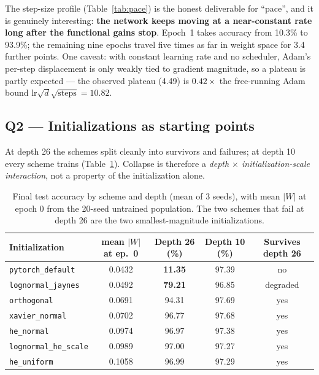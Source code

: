 \documentclass[11pt]{article}
\begin{document}
The step-size profile (Table~\ref{tab:pace}) is the honest deliverable for ``pace'', and it is
genuinely interesting: \textbf{the network keeps moving at a near-constant rate long after the
functional gains stop}. Epoch~1 takes accuracy from 10.3\% to 93.9\%; the remaining nine epochs
travel five times as far in weight space for 3.4 further points. One caveat: with constant
learning rate and no scheduler, Adam's per-step displacement is only weakly tied to gradient
magnitude, so a plateau is partly expected --- the observed plateau (4.49) is $0.42\times$ the
free-running Adam bound $\text{lr}\sqrt{d}\sqrt{\text{steps}} = 10.82$.

\subsection{Q2 --- Initializations as starting points}

At depth 26 the schemes split cleanly into survivors and failures; at depth 10 every scheme
trains (Table~\ref{tab:acc}). Collapse is therefore a \emph{depth $\times$ initialization-scale
interaction}, not a property of the initialization alone.

\begin{table}[htbp]\centering
\caption{Final test accuracy by scheme and depth (mean of 3 seeds), with mean $|W|$ at epoch 0
from the 20-seed untrained population. The two schemes that fail at depth 26 are the two
smallest-magnitude initializations.}
\label{tab:acc}
\begin{tabular}{lccc c}
\toprule
Initialization & mean $|W|$ at ep.\ 0 & Depth 26 (\%) & Depth 10 (\%) & Survives depth 26 \\
\midrule
\texttt{pytorch\_default}    & 0.0432 & \textbf{11.35} & 97.39 & no \\
\texttt{lognormal\_jaynes}   & 0.0492 & \textbf{79.21} & 96.85 & degraded \\
\texttt{orthogonal}          & 0.0691 & 94.31 & 97.69 & yes \\
\texttt{xavier\_normal}      & 0.0702 & 96.77 & 97.68 & yes \\
\texttt{he\_normal}          & 0.0974 & 96.97 & 97.38 & yes \\
\texttt{lognormal\_he\_scale}& 0.0989 & 97.00 & 97.27 & yes \\
\texttt{he\_uniform}         & 0.1058 & 96.99 & 97.29 & yes \\
\bottomrule
\end{tabular}
\end{table}
\end{document}
